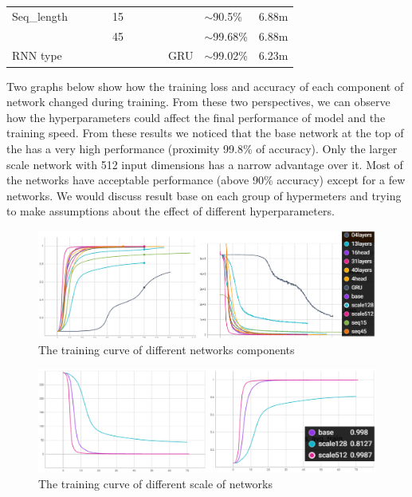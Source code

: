 \begin{table}[hbt!]
\begin{tabular}{lllllllllll}
Seq\_length    &               &               &                & 15              &               &               &            &               & $\sim$90.5\%           & 6.88m                                   \\
               &               &               &                & 45              &               &               &            &               & $\sim$99.68\%          & 6.88m                                   \\ \hline
RNN type       &               &               &                &                 &               &               &            & GRU           & $\sim$99.02\%          & 6.23m                                   \\ \hline
\end{tabular}
\end{table}

Two graphs below show how the training loss and accuracy of each component of network changed during training. From these two perspectives, we can observe how the hyperparameters could affect the final performance of model and the training speed. From these results we noticed that the base network at the top of the has a very high performance (proximity 99.8\% of accuracy). Only the larger scale network with 512 input dimensions has a narrow advantage over it. Most of the networks have acceptable performance (above 90\% accuracy) except for a few networks. We would discuss result base on each group of hypermeters and trying to make assumptions about the effect of different hyperparameters. 

\begin{figure}[hbt!]
    \centering
    \includegraphics[width=0.9\linewidth]{myReport//figures/componet_curve.png}
    \caption{The training curve of different networks components}
    \label{fig:enter-label}
\end{figure}


\begin{figure}[hbt!]
    \centering
    \includegraphics[width=0.9\linewidth]{myReport//figures/scale_curve.png}
    \caption{The training curve of different scale of networks}
    \label{fig:enter-label}
\end{figure}


